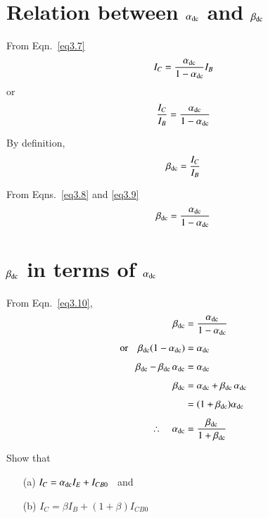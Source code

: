 \section[Relation between $\alpha_{\dc}$ and $\beta_{\dc}$]{Relation between \boldmath$\alpha_{\dc}$ and $\beta_{\dc}$}\label{sec3.11}

From Eqn.~\eqref{eq3.7}
$$
I_{C}=\frac{\alpha_{\operatorname{dc}}}{1-\alpha_{\operatorname{dc}}}I_{B}
$$
or
\begin{equation}
\frac{I_{C}}{I_{B}}=\dfrac{\alpha_{\operatorname{dc}}}{1-\alpha_{\operatorname{dc}}}\label{eq3.8}
\end{equation}

By definition,
\begin{equation}
\beta_{\operatorname{dc}}=\dfrac{I_{C}}{I_{B}}\label{eq3.9}
\end{equation}

From Eqns.~\eqref{eq3.8} and \eqref{eq3.9}
\begin{equation}
\beta_{\operatorname{dc}}=\dfrac{\alpha_{\operatorname{dc}}}{1-\alpha_{\operatorname{dc}}}\label{eq3.10}
\end{equation}

\eject

\section[$\beta_{\dc}$ in terms of $\alpha_{\dc}$]{\boldmath$\beta_{\dc}$ in terms of $\alpha_{\dc}$}\label{sec3.12}

From Eqn.~\eqref{eq3.10},
\begin{align}
\beta_{\operatorname{dc}} &= \frac{\alpha_{\operatorname{dc}}}{1-\alpha_{\operatorname{dc}}}\notag\\[4pt]
\text{or}\quad \beta_{\operatorname{dc}}(1-\alpha_{\operatorname{dc}}) &= \alpha_{\operatorname{dc}}\notag\\[4pt]
\beta_{\operatorname{dc}}-\beta_{\operatorname{dc}}\,\alpha_{\operatorname{dc}} &= \alpha_{\operatorname{dc}}\notag\\[4pt]
\beta_{\operatorname{dc}} &= \alpha_{\operatorname{dc}}+\beta_{\operatorname{dc}}\,\alpha_{\operatorname{dc}}\notag\\[4pt]
&= (1+\beta_{\operatorname{dc}})\alpha_{\operatorname{dc}}\notag\\[4pt]
\therefore\quad \alpha_{\operatorname{dc}} &= \frac{\beta_{\operatorname{dc}}}{1+\beta_{\operatorname{dc}}}\label{eq3.11}
\end{align}

\begin{example}\label{add3.1}
Show that
\begin{itemize}
\item[(a)] $I_{C}=\alpha_{\operatorname{dc}}I_{E}+I_{CB0}$ \ and

\item[(b)] $I_{C}=\beta I_{B}+(1+\beta)I_{CB0}$
\end{itemize}
\end{example}

